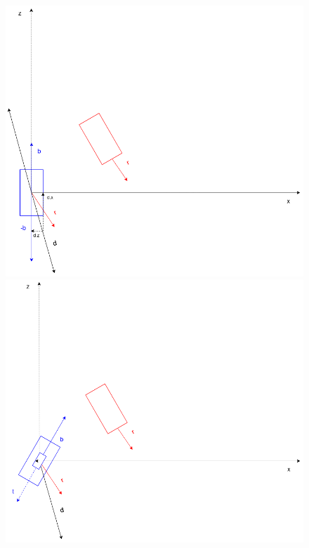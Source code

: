 \documentclass[14pt]{article}
\begin{document}
\begin{figure}[H]
\begin{minipage}[t]{0.6\textwidth}
\center
\includegraphics[width=\textwidth]{diagrams/chart.png}
\end{minipage}
\hfill
\begin{minipage}[t]{0.6\textwidth}
\center
\includegraphics[width=\textwidth]{diagrams/chartFirstRot.png}
\end{minipage}

\end{figure}
\end{document}

